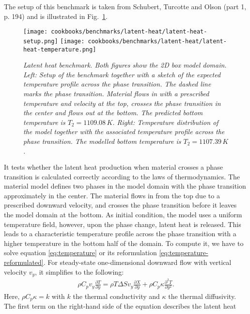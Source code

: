 \documentclass{article}
\begin{document}
The setup of this benchmark is taken from Schubert, Turcotte and Olson \cite{STO01} (part 1, p. 194) and is illustrated in Fig.~\ref{fig:latent-heat-benchmark}.
\begin{figure}
  \begin{center}
    \texttt{[image: cookbooks/benchmarks/latent-heat/latent-heat-setup.png]}
    \hfill
    \texttt{[image: cookbooks/benchmarks/latent-heat/latent-heat-temperature.png]}
  \end{center}
  \caption{\it Latent heat benchmark. Both figures show the 2D box model domain.
      Left: Setup of the benchmark together with a sketch of the expected
      temperature profile across the phase transition. The dashed line marks
      the phase transition. Material flows in with a prescribed temperature and
      velocity at the top, crosses the phase transition in the center and flows
      out at the bottom. The predicted bottom temperature is $T_2 = 1109.08 \, \si{K}$.
      Right: Temperature distribution of the model together with the associated
      temperature profile across the phase transition. The modelled bottom
      temperature is $T_2 = 1107.39 \, \si{K}$.}
  \label{fig:latent-heat-benchmark}
\end{figure}
It tests whether the latent heat production when material crosses a phase
transition is calculated correctly according to the laws of thermodynamics. The material
model defines two phases in the model domain with the phase transition
approximately in the center. The material flows in from the top due to a
prescribed downward velocity, and crosses the phase transition before it leaves
the model domain at the bottom. As initial condition, the model uses a uniform
temperature field, however, upon the phase change, latent heat is released. This
leads to a characteristic temperature profile across the phase transition with a
higher temperature in the bottom half of the domain. To compute it, we have to solve 
equation \eqref{eq:temperature} or its reformulation
\eqref{eq:temperature-reformulated}. For
steady-state one-dimensional downward flow with vertical velocity $v_y$, it
simplifies to the following:
\begin{gather*}
\rho C_p
v_y
\frac{\partial T}{\partial y} = 
\rho T \Delta S v_y \frac{\partial X}{\partial y} 
+ \rho C_p \kappa
\frac{\partial^2 T}{\partial y^2}.
\end{gather*}
Here, $\rho C_p \kappa = k$ with $k$ the thermal conductivity and $\kappa$ the
thermal diffusivity.
The first term on the right-hand side of the equation describes the latent heat
\end{document}
